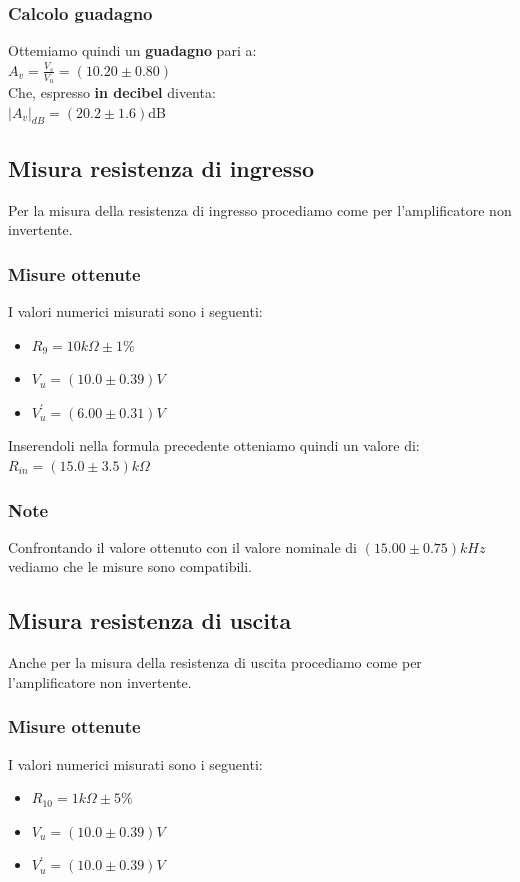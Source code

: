 \documentclass{article}
\begin{document}
\subsubsection{Calcolo guadagno}
Ottemiamo quindi un \textbf{guadagno} pari a:\\ \large $A_v = \frac{V_s}{V_u} = (10.20 \pm 0.80)$ \normalsize \\Che, espresso \textbf{in decibel} diventa:\\ \large $ |A_v|_{dB} = (20.2 \pm 1.6)$dB \normalsize
\subsection{Misura resistenza di ingresso}
Per la misura della resistenza di ingresso procediamo come per l'amplificatore non invertente.
\subsubsection{Misure ottenute}
I valori numerici misurati sono i seguenti:
\begin{itemize}
	\item \large $R_{9} = 10k\Omega \pm 1\%$
	\item \large $V_{u} = (10.0 \pm 0.39)V$
	\item \large $V_{u}^{'} = (6.00 \pm 0.31)V$
\end{itemize}
Inserendoli nella formula precedente otteniamo quindi un valore di: \\ \large $R_{in} = (15.0 \pm 3.5)k\Omega$
\subsubsection{Note}
Confrontando il valore ottenuto con il valore nominale di $(15.00 \pm 0.75)kHz$ vediamo che le misure sono compatibili.
\subsection{Misura resistenza di uscita}
Anche per la misura della resistenza di uscita procediamo come per l'amplificatore non invertente.
\subsubsection{Misure ottenute}
I valori numerici misurati sono i seguenti:
\begin{itemize}
	\item \large $R_{10} = 1k\Omega \pm 5\%$
	\item \large $V_{u} = (10.0 \pm 0.39)V$
	\item \large $V_{u}^{'} = (10.0 \pm 0.39)V$
\end{itemize}
\end{document}
